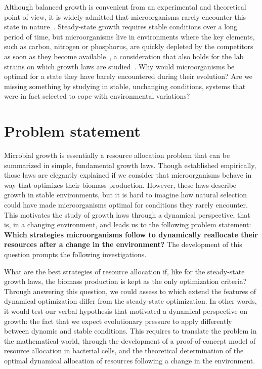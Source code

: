 Although balanced growth is convenient from an experimental and theoretical point of view, it is widely admitted that microorganisms rarely encounter this state in nature~\cite{schaechter_microbe_2006}.
Steady-state growth requires stable conditions over a long period of time, but microorganisms live in
environments where the key elements, such as carbon, nitrogen or phosphorus, are quickly depleted by the competitors as soon as they become available~\cite{mcarthur_microbial_2006,menge_nitrogen_2012,hobbie_microbes_2013}, a consideration that also holds for the lab strains on which growth laws are studied~\cite{savageau_escherichia_1983,savageau_demand_1998,blount_unexhausted_2015,vanelsas_survival_2011}.
Why would microorganisms be optimal for a state they have barely encountered during their evolution?
Are we missing something by studying in stable, unchanging conditions, systems that were in fact selected to cope with environmental variations?

\section{Problem statement}

Microbial growth is essentially a resource allocation problem that can be summarized in simple, fundamental growth laws.
Though established empirically, those laws are elegantly explained if we consider that microorganisms behave in way that optimizes their biomass production.
However, these laws describe growth in stable environments, but it is hard to imagine how natural selection could have made microorganisms optimal for conditions they rarely encounter.
This motivates the study of growth laws through a dynamical perspective, that is, in a changing environment, and leads us to the following problem statement: \textbf{Which strategies microorganisms follow to dynamically reallocate their resources after a change in the environment?}
The development of this question prompts the following investigations.

What are the best strategies of resource allocation if, like for the steady-state growth laws, the biomass production is kept as the only optimization criteria?
Through answering this question, we could assess to which extend the features of dynamical optimization differ from the steady-state optimization.
In other words, it would test our verbal hypothesis that motivated a dynamical perspective on growth: the fact that we expect evolutionary pressure to apply differently between dynamic and stable conditions.
This requires to translate the problem in the mathematical world, through the development of a proof-of-concept model of resource allocation in bacterial cells, and the theoretical determination of the optimal dynamical allocation of resources following a change in the environment.

